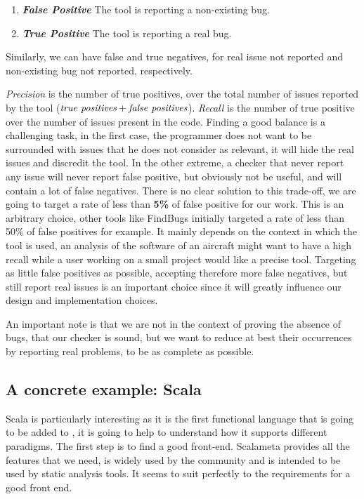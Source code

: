 \begin{enumerate}
	\item \textbf{\textit{False Positive}} \newline The tool is reporting a non-existing bug.
	\item \textbf{\textit{True Positive}} \newline The tool is reporting a real bug. 
\end{enumerate}
Similarly, we can have false and true negatives, for real issue not reported and non-existing bug not reported, respectively. 

\emph{Precision} is the number of true positives, over the total number of issues reported by the tool ($ \emph{true positives} + \emph{false positives} $). \emph{Recall} is the number of true positive over the number of issues present in the code. 
Finding a good balance is a challenging task, in the first case, the programmer does not want to be surrounded with issues that he does not consider as relevant, it will hide the real issues and discredit the tool.
In the other extreme, a checker that never report any issue will never report false positive, but obviously not be useful, and will contain a lot of false negatives. 
There is no clear solution to this trade-off, we are going to target a rate of less than \textbf{5\%} of false positive for our work.
This is an arbitrary choice, other tools like FindBugs \cite{Hovemeyer:2004:FBE:1052883.1052895} initially targeted a rate of less than 50\% of false positives for example. 
It mainly depends on the context in which the tool is used, an analysis of the software of an aircraft might want to have a high recall while a user working on a small project would like a precise tool. 
Targeting as little false positives as possible, accepting therefore more false negatives, but still report real issues is an important choice since it will greatly influence our design and implementation choices.

An important note is that we are not in the context of proving the absence of bugs, that our checker is sound, but we want to reduce at best their occurrences by reporting real problems, to be as complete as possible.

\subsection{A concrete example: Scala}
\label{subsec:concrete_example}

Scala is particularly interesting as it is the first functional language that is going to be added to \slang{}, it is going to help to understand how it supports different paradigms.
The first step is to find a good front-end.
Scalameta \cite{Scalameta:2019:Online} provides all the features that we need, is widely used by the community and is intended to be used by static analysis tools. 
It seems to suit perfectly to the requirements for a good front end.


